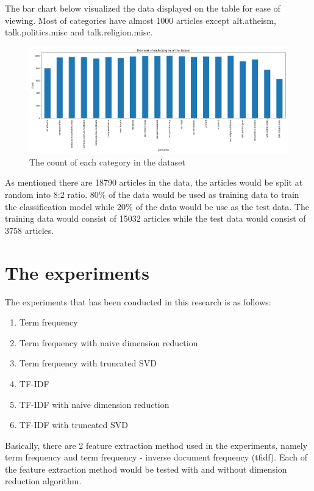 The bar chart below visualized the data displayed on the table for ease of viewing. Most of categories have almost 1000 articles except alt.atheism, talk.politics.misc and talk.religion.misc.

\begin{figure} [ht]
	\centering
	\includegraphics[width=\textwidth]{count}
	\caption{The count of each category in the dataset}
	\label{fig:freqCount}
\end{figure}

As mentioned there are 18790 articles in the data, the articles would be split at random into 8:2 ratio. 80\% of the data would be used as training data to train the classification model while 20\% of the data would be use as the test data. The training data would consist of 15032 articles while the test data would consist of 3758 articles.\\


\section{The experiments}
The experiments that has been conducted in this research is as follows:
\begin{enumerate}
	\item Term frequency
	\item Term frequency with naive dimension reduction
	\item Term frequency with truncated SVD
	\item TF-IDF
	\item TF-IDF with naive dimension reduction
	\item TF-IDF with truncated SVD
\end{enumerate}

Basically, there are 2 feature extraction method used in the experiments, namely term frequency and term frequency - inverse document frequency (\ac{tfidf}). Each of the feature extraction method would be tested with and without dimension reduction algorithm.

